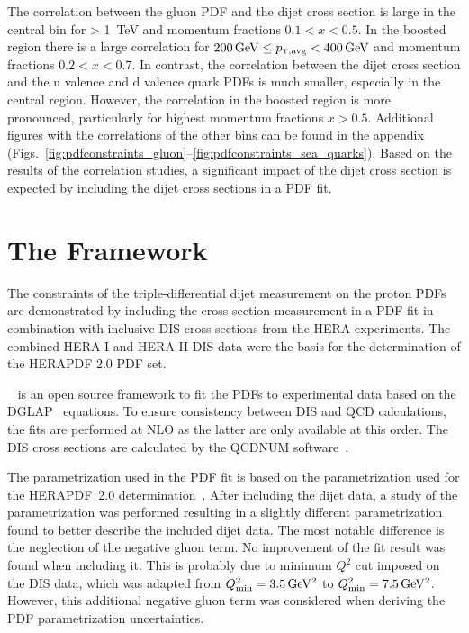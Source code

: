 The correlation between the gluon PDF and the dijet cross section is large in
the central bin for \ptavg > \SI{1}{\TeV} and momentum fractions $0.1 < x <
0.5$. In the boosted region there is a large correlation for $\SI{200}{\GeV}
\leq \ptavg < \SI{400}{\GeV}$ and momentum fractions $0.2 < x < 0.7$. In
contrast, the correlation between the dijet cross section and the u valence and
d valence quark PDFs is much smaller, especially in the central region. However,
the correlation in the boosted region is more pronounced, particularly for
highest momentum fractions $x > 0.5$. Additional figures with the correlations
of the other bins can be found in the appendix
(Figs.~\ref{fig:pdfconstraints_gluon}--\ref{fig:pdfconstraints_sea_quarks}). Based
on the results of the correlation studies, a significant impact of the dijet
cross section is expected by including the dijet cross sections in a PDF fit.

\section{The \xfitter Framework}
\label{section:herafittersetup}

The constraints of the triple-differential dijet measurement on the proton PDFs
are demonstrated by including the cross section measurement in a PDF fit in
combination with inclusive DIS cross sections from the HERA experiments. The
combined HERA-I and HERA-II DIS data were the
basis for the determination of the HERAPDF 2.0 PDF set.

\xfitter~\cite{Alekhin:2014irh} is an open source framework to fit the PDFs to experimental data based
on the DGLAP~\cite{Gribov:1972ri,Altarelli:1977zs,Dokshitzer:1977sg} equations.
To ensure consistency between DIS and QCD calculations, the fits are performed
at NLO as the latter are only available at this order. The DIS cross sections
are calculated by the QCDNUM software~\cite{Botje:2010ay}.

The parametrization used in the PDF fit is based on the parametrization used for
the HERAPDF~2.0 determination~\cite{Abramowicz:2015mha}. After including the
dijet data, a study of the parametrization was performed resulting in a slightly
different parametrization found to better describe the included dijet data. The
most notable difference is the neglection of the negative gluon term. No
improvement of the fit result was found when including it. This is probably due
to minimum $Q^2$ cut imposed on the DIS data, which was adapted from
$Q^2_\mathrm{min}=\SI{3.5}{\GeVsq}$ to $Q^2_\mathrm{min}=\SI{7.5}{\GeVsq}$.
However, this additional negative gluon term was considered when deriving the
PDF parametrization uncertainties.

